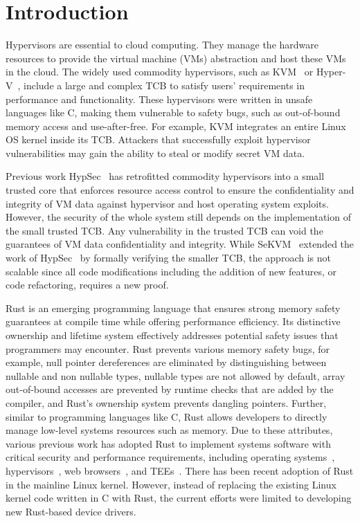 
\chapter{Introduction}

Hypervisors are essential to cloud computing. They manage the hardware
resources to provide the virtual machine (VMs) abstraction and host
these VMs in the cloud.
The widely used commodity
hypervisors, such as KVM~\cite{kivity07kvm} or Hyper-V~\cite{hyperv},
include a large and complex TCB to satisfy users' requirements in
performance and functionality. These hypervisors were written in unsafe
languages like C, making them vulnerable to safety bugs, such as
out-of-bound memory access and use-after-free. For example, KVM
integrates an entire Linux OS kernel inside its TCB. Attackers that
successfully exploit hypervisor vulnerabilities may gain the ability
to steal or modify secret VM data.

Previous work HypSec~\cite{hypsec} has retrofitted commodity hypervisors into a
small trusted core that enforces resource access control to ensure the
confidentiality and integrity of VM data against hypervisor and host operating
system exploits. However, the security of the whole system still depends on the
implementation of the small trusted TCB. Any vulnerability in the trusted TCB
can void the guarantees of VM data confidentiality and integrity.
While SeKVM~\cite{sekvm} extended the work of HypSec~\cite{hypsec} by formally
verifying the smaller TCB, the approach is not scalable since all code
modifications including the addition of new features, or code refactoring,
requires a new proof.

Rust is an emerging programming language that ensures strong memory safety
guarantees at compile time while offering performance efficiency.
Its distinctive ownership and lifetime system
effectively addresses potential safety issues that programmers may encounter.
Rust prevents various memory safety bugs, for example, null pointer
dereferences are eliminated by distinguishing between nullable and non
nullable types, nullable types are not allowed by default, array out-of-bound
accesses are prevented by runtime checks that are added by the compiler, and
Rust's ownership system prevents dangling pointers.
Further, similar to programming languages like C, Rust allows developers to
directly manage low-level systems resources such as memory. Due to these
attributes, various previous work has adopted Rust to implement systems
software with critical security and performance requirements, including
operating systems~\cite{NrOS, Redleaf, TockOS, theseus},
hypervisors~\cite{DuVisor, RustyHermit}, web browsers~\cite{servo},
and TEEs~\cite{rustsgx,rustee}.
There has been recent adoption of Rust in the mainline Linux kernel. However,
instead of replacing the existing Linux kernel code written in C with Rust,
the current efforts were limited to developing new Rust-based device drivers.

